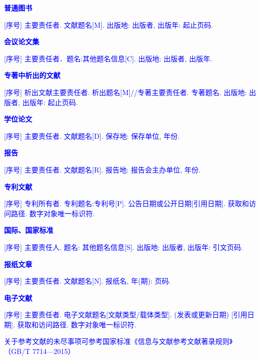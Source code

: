 \begin{bibprint}
\textcolor{blue}{\textbf{普通图书}}

\noindent\textcolor{blue}{[序号] 主要责任者. 文献题名[M]. 出版地: 出版者, 出版年: 起止页码. }
\cite{张伯伟2002全唐五代诗格会考, OBRIEN1994Aircraft}

\printbibliography [keyword={book},heading=none]

\textcolor{blue}{\textbf{会议论文集}}

\noindent\textcolor{blue}{[序号] 主要责任者．题名:其他题名信息[C]. 出版地: 出版者, 出版年. }
\cite{雷光春2012}

\printbibliography [type=proceedings,heading=none]

\textcolor{blue}{\textbf{专著中析出的文献}}

\noindent\textcolor{blue}{[序号] 析出文献主要责任者. 析出题名[M]//专著主要责任者. 专著题名. 出版地: 出版者, 出版年: 起止页码. }
\cite{白书农}

\printbibliography [type=inbook,heading=none]

\textcolor{blue}{\textbf{学位论文}}

\noindent\textcolor{blue}{[序号] 主要责任者. 文献题名[D]. 保存地: 保存单位, 年份. }
\cite{zhanghesheng, Sobieski}

\printbibliography [keyword={thesis},heading=none]

\textcolor{blue}{\textbf{报告}}

\noindent\textcolor{blue}{[序号] 主要责任者. 文献题名[R]. 报告地: 报告会主办单位, 年份. }
\cite{fengxiqiao, Sobieszczanski}

\printbibliography [keyword={techreport},heading=none]

\textcolor{blue}{\textbf{专利文献}}

\noindent\textcolor{blue}{[序号] 专利所有者. 专利题名:专利号[P]. 公告日期或公开日期[引用日期]. 获取和访问路径. 数字对象唯一标识符.}
\cite{jiangxizhou}

\printbibliography [type=patent,heading=none]

\textcolor{blue}{\textbf{国际、国家标准}}

\noindent\textcolor{blue}{[序号] 主要责任人. 题名: 其他题名信息[S]. 出版地: 出版者, 出版年: 引文页码.}
\cite{GB/T3792.4-2009}

\printbibliography [keyword={standard},heading=none]

\textcolor{blue}{\textbf{报纸文章}}

\noindent\textcolor{blue}{[序号] 主要责任者. 文献题名[N]. 报纸名, 年(期): 页码. }
\cite{xiexide}

\printbibliography [keyword={newspaper},heading=none]

\textcolor{blue}{\textbf{电子文献}}

\noindent\textcolor{blue}{[序号] 主要责任者. 电子文献题名[文献类型/载体类型]. (发表或更新日期) [引用日期]. 获取和访问路径. 数字对象唯一标识符. }
\cite{yaoboyuan}

\printbibliography [keyword={online},heading=none]

\textcolor{blue}{关于参考文献的未尽事项可参考国家标准《信息与文献参考文献著录规则》（GB/T 7714—2015）}

\end{bibprint}

